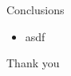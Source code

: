 \begin{frame}{Conclusions}	
	\begin{itemize}
		\item asdf
	\end{itemize}
\end{frame}
\begin{frame}{}
\begin{center}
    \huge{Thank you}
\end{center}
\end{frame}
